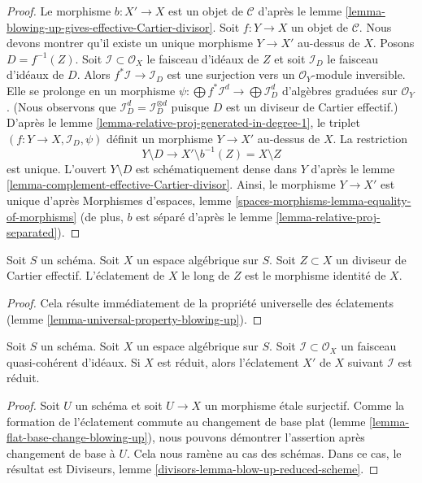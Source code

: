 \begin{proof}
Le morphisme $b : X' \to X$ est un objet de $\mathcal{C}$ d'après le
lemme \ref{lemma-blowing-up-gives-effective-Cartier-divisor}.
Soit $f : Y \to X$ un objet de $\mathcal{C}$. Nous devons montrer qu'il existe
un unique morphisme $Y \to X'$ au-dessus de $X$. Posons $D = f^{-1}(Z)$.
Soit $\mathcal{I} \subset \mathcal{O}_X$ le faisceau d'idéaux de $Z$
et soit $\mathcal{I}_D$ le faisceau d'idéaux de $D$. Alors
$f^*\mathcal{I} \to \mathcal{I}_D$ est une surjection
vers un $\mathcal{O}_Y$-module inversible. Elle se prolonge en un morphisme
$\psi : \bigoplus f^*\mathcal{I}^d \to \bigoplus \mathcal{I}_D^d$
d'algèbres graduées sur $\mathcal{O}_Y$. (Nous observons que
$\mathcal{I}_D^d = \mathcal{I}_D^{\otimes d}$ puisque $D$ est un
diviseur de Cartier effectif.) D'après le
lemme \ref{lemma-relative-proj-generated-in-degree-1},
le triplet $(f : Y \to X, \mathcal{I}_D, \psi)$ définit un
morphisme $Y \to X'$ au-dessus de $X$. La restriction
$$
Y \setminus D \longrightarrow X' \setminus b^{-1}(Z) = X \setminus Z
$$
est unique. L'ouvert $Y \setminus D$ est schématiquement dense dans $Y$
d'après le lemme \ref{lemma-complement-effective-Cartier-divisor}. 
Ainsi, le morphisme $Y \to X'$ est unique d'après
Morphismes d'espaces, lemme \ref{spaces-morphisms-lemma-equality-of-morphisms}
(de plus, $b$ est séparé d'après le lemme
\ref{lemma-relative-proj-separated}).
\end{proof}

\begin{lemma}
\label{lemma-blow-up-effective-Cartier-divisor}
Soit $S$ un schéma. Soit $X$ un espace algébrique sur $S$.
Soit $Z \subset X$ un diviseur de Cartier effectif.
L'éclatement de $X$ le long de $Z$ est le morphisme identité de $X$.
\end{lemma}

\begin{proof}
Cela résulte immédiatement de la propriété universelle des éclatements
(lemme \ref{lemma-universal-property-blowing-up}).
\end{proof}

\begin{lemma}
\label{lemma-blow-up-reduced-space}
Soit $S$ un schéma. Soit $X$ un espace algébrique sur $S$.
Soit $\mathcal{I} \subset \mathcal{O}_X$ un
faisceau quasi-cohérent d'idéaux. Si $X$ est réduit, alors
l'éclatement $X'$ de $X$ suivant $\mathcal{I}$ est réduit.
\end{lemma}

\begin{proof}
Soit $U$ un schéma et soit $U \to X$ un morphisme \'etale surjectif.
Comme la formation de l'éclatement commute au changement de base plat
(lemme \ref{lemma-flat-base-change-blowing-up}),
nous pouvons démontrer l'assertion après changement de base à $U$.
Cela nous ramène au cas des schémas.
Dans ce cas, le résultat est
Diviseurs, lemme \ref{divisors-lemma-blow-up-reduced-scheme}.
\end{proof}

